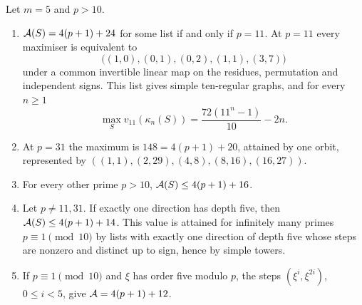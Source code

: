 \begin{theorem}\label{gra:thm:fivestep}
Let $m=5$ and $p>10$.
\begin{enumerate}[label=\textup{(\alph*)}]
\item $\mathcal{A}(S)=4(p+1)+24$ for some list if and only if $p=11$. At $p=11$
every maximiser is equivalent to
\[
 \bigl((1,0),(0,1),(0,2),(1,1),(3,7)\bigr)
\]
under a common invertible linear map on the residues, permutation and
independent signs. This list gives simple ten-regular graphs, and for
every $n\ge1$
\[
 \max_Sv_{11}(\kappa_n(S))=\frac{72(11^n-1)}{10}-2n .
\]
\item At $p=31$ the maximum is $148=4(p+1)+20$, attained by one orbit,
represented by $((1,1),(2,29),(4,8),(8,16),(16,27))$.
\item For every other prime $p>10$, $\mathcal{A}(S)\le4(p+1)+16$.
\item Let $p\ne11,31$. If exactly one direction has depth five, then
$\mathcal{A}(S)\le4(p+1)+14$. This value is attained for infinitely many primes
$p\equiv1\pmod{10}$ by lists with exactly one direction of depth five whose
steps are nonzero and distinct up to sign, hence by simple towers.
\item If $p\equiv1\pmod{10}$ and $\xi$ has order five modulo $p$, the steps
$(\xi^i,\xi^{2i})$, $0\le i<5$, give $\mathcal{A}=4(p+1)+12$.
\end{enumerate}
\end{theorem}

